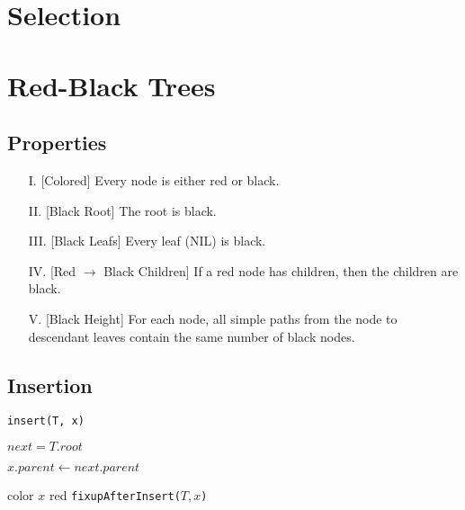 \documentclass{summary}
\begin{document}
\section{Selection}


\section{Red-Black Trees}

\subsection{Properties}
\begin{itemize}
  \item[I.]\label{properties:1} [Colored] Every node is either red or black.
  \item[II.]\label{properties:2} [Black Root] The root is black.
  \item[III.]\label{properties:3} [Black Leafs] Every leaf (NIL) is black.
  \item[IV.]\label{properties:4} [Red $\to$ Black Children] If a red node has children, then the children are black.
  \item[V.]\label{properties:5} [Black Height] For each node, all simple paths from the node to descendant leaves contain the same number of black nodes.
\end{itemize}

\subsection{Insertion}

\begin{algorithm}[H]
  \caption{\texttt{insert(T, x)}}

  \BlankLine

  $next = T.root$\;

  $x.parent \gets next.parent$\;

  color $x$ red\;
  \texttt{fixupAfterInsert($T, x$)}\;
\end{algorithm}
\end{document}

